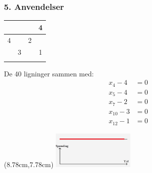 \documentclass[10pt,notheorems,xcolor=pdftex,dvipsnames,table]{beamer}
\renewcommand{\{}{\left\lbrace}
\renewcommand{\}}{\right\rbrace}
\begin{document}
\begin{frame}[t]
\frametitle{
		\LARGE{5. Anvendelser}}
\begin{table}
\begin{tabular}{|c|c||c|c|} 
\hline
 &  &  & 4\\
\hline
4 &  & 2 & \\
\hline\hline
 & 3 &  & 1\\
\hline
 &  &  & \\
\hline
\end{tabular}
\end{table} 
De 40 ligninger sammen med:
\begin{align*}
	x_4 - 4 &= 0 \\
	x_5 - 4 &= 0 \\
	x_7 - 2 &= 0 \\
	x_{10} - 3 &= 0 \\
	x_{12} - 1 &= 0
\end{align*}

				\begin{textblock*}{0.1cm}(8.78cm,7.78cm)  
					\includegraphics[width=4cm]{disposition/d20.jpg}
				\end{textblock*}	
\end{frame}
\end{document}
